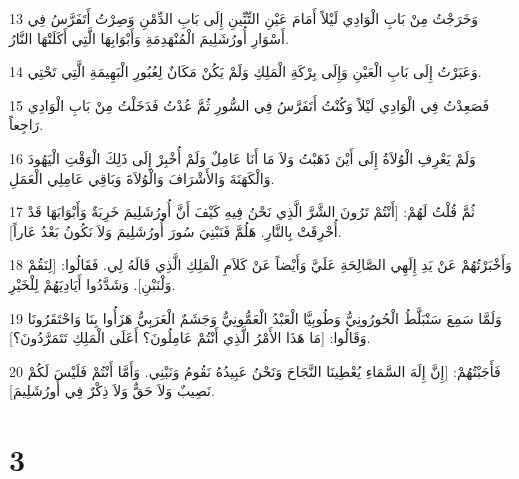 \par 13 وَخَرَجْتُ مِنْ بَابِ الْوَادِي لَيْلاً أَمَامَ عَيْنِ التِّنِّينِ إِلَى بَابِ الدِّمْنِ وَصِرْتُ أَتَفَرَّسُ فِي أَسْوَارِ أُورُشَلِيمَ الْمُنْهَدِمَةِ وَأَبْوَابِهَا الَّتِي أَكَلَتْهَا النَّارُ.
\par 14 وَعَبَرْتُ إِلَى بَابِ الْعَيْنِ وَإِلَى بِرْكَةِ الْمَلِكِ وَلَمْ يَكُنْ مَكَانٌ لِعُبُورِ الْبَهِيمَةِ الَّتِي تَحْتِي.
\par 15 فَصَعِدْتُ فِي الْوَادِي لَيْلاً وَكُنْتُ أَتَفَرَّسُ فِي السُّورِ ثُمَّ عُدْتُ فَدَخَلْتُ مِنْ بَابِ الْوَادِي رَاجِعاً.
\par 16 وَلَمْ يَعْرِفِ الْوُلاَةُ إِلَى أَيْنَ ذَهَبْتُ وَلاَ مَا أَنَا عَامِلٌ وَلَمْ أُخْبِرْ إِلَى ذَلِكَ الْوَقْتِ الْيَهُودَ وَالْكَهَنَةَ وَالأَشْرَافَ وَالْوُلاَةَ وَبَاقِي عَامِلِي الْعَمَلِ.
\par 17 ثُمَّ قُلْتُ لَهُمْ: [أَنْتُمْ تَرُونَ الشَّرَّ الَّذِي نَحْنُ فِيهِ كَيْفَ أَنَّ أُورُشَلِيمَ خَرِبَةٌ وَأَبْوَابَهَا قَدْ أُحْرِقَتْ بِالنَّارِ. هَلُمَّ فَنَبْنِيَ سُورَ أُورُشَلِيمَ وَلاَ نَكُونُ بَعْدُ عَاراً].
\par 18 وَأَخْبَرْتُهُمْ عَنْ يَدِ إِلَهِي الصَّالِحَةِ عَلَيَّ وَأَيْضاً عَنْ كَلاَمِ الْمَلِكِ الَّذِي قَالَهُ لِي. فَقَالُوا: [لِنَقُمْ وَلْنَبْنِ]. وَشَدَّدُوا أَيَادِيَهُمْ لِلْخَيْرِ.
\par 19 وَلَمَّا سَمِعَ سَنْبَلَّطُ الْحُورُونِيُّ وَطُوبِيَّا الْعَبْدُ الْعَمُّونِيُّ وَجَشَمٌ الْعَرَبِيُّ هَزَأُوا بِنَا وَاحْتَقَرُونَا وَقَالُوا: [مَا هَذَا الأَمْرُ الَّذِي أَنْتُمْ عَامِلُونَ؟ أَعَلَى الْمَلِكِ تَتَمَرَّدُونَ؟].
\par 20 فَأَجَبْتُهُمْ: [إِنَّ إِلَهَ السَّمَاءِ يُعْطِينَا النَّجَاحَ وَنَحْنُ عَبِيدُهُ نَقُومُ وَنَبْنِي. وَأَمَّا أَنْتُمْ فَلَيْسَ لَكُمْ نَصِيبٌ وَلاَ حَقٌّ وَلاَ ذِكْرٌ فِي أُورُشَلِيمَ].

\chapter{3}

